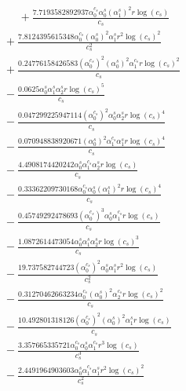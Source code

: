 \documentclass[10pt]{article}
\begin{document}
\begin{align*}
\phantom{R_{1,7}} &\phantom{={}}{}  + \frac{7.7193582892937 \alpha_{0}^{c_s} \alpha_{0}^s \left(\alpha_{1}^s\right)^{2} r \log{\left(c_{s} \right)}}{c_{s}} \\
&{}  + \frac{7.8124395615348 \alpha_{0}^{c_s} \left(\alpha_{0}^s\right)^{2} \alpha_{1}^s r^{2} \log{\left(c_{s} \right)}^{2}}{c_{s}^{2}} \\
&{}  + \frac{0.24776158426583 \left(\alpha_{0}^{c_s}\right)^{2} \left(\alpha_{0}^s\right)^{2} \alpha_{1}^{c_s} r \log{\left(c_{s} \right)}^{2}}{c_{s}} \\
&{}  - \frac{0.0625 \alpha_{0}^s \alpha_{1}^s \alpha_{2}^s r \log{\left(c_{s} \right)}^{5}}{c_{s}} \\
&{}  - \frac{0.047299225947114 \left(\alpha_{0}^{c_s}\right)^{2} \alpha_{0}^s \alpha_{2}^s r \log{\left(c_{s} \right)}^{4}}{c_{s}} \\
&{}  - \frac{0.070948838920671 \left(\alpha_{0}^s\right)^{2} \alpha_{1}^{c_s} \alpha_{1}^s r \log{\left(c_{s} \right)}^{4}}{c_{s}} \\
&{}  - \frac{4.4908174420242 \alpha_{0}^s \alpha_{1}^{c_s} \alpha_{2}^s r \log{\left(c_{s} \right)}}{c_{s}} \\
&{}  - \frac{0.33362209730168 \alpha_{0}^{c_s} \alpha_{0}^s \left(\alpha_{1}^s\right)^{2} r \log{\left(c_{s} \right)}^{4}}{c_{s}} \\
&{}  - \frac{0.45749292478693 \left(\alpha_{0}^{c_s}\right)^{3} \alpha_{0}^s \alpha_{1}^{c_s} r \log{\left(c_{s} \right)}}{c_{s}} \\
&{}  - \frac{1.0872614473054 \alpha_{0}^s \alpha_{1}^s \alpha_{2}^s r \log{\left(c_{s} \right)}^{3}}{c_{s}} \\
&{}  - \frac{19.737582744723 \left(\alpha_{0}^{c_s}\right)^{2} \alpha_{0}^s \alpha_{1}^s r^{2} \log{\left(c_{s} \right)}}{c_{s}^{2}} \\
&{}  - \frac{0.31270462663234 \alpha_{0}^{c_s} \left(\alpha_{0}^s\right)^{2} \alpha_{2}^{c_s} r \log{\left(c_{s} \right)}^{2}}{c_{s}} \\
&{}  - \frac{10.492801318126 \left(\alpha_{0}^{c_s}\right)^{2} \left(\alpha_{0}^s\right)^{2} \alpha_{1}^s r \log{\left(c_{s} \right)}}{c_{s}} \\
&{}  - \frac{3.357665335721 \alpha_{0}^{c_s} \alpha_{0}^s \alpha_{1}^{c_s} r^{3} \log{\left(c_{s} \right)}}{c_{s}^{3}} \\
&{}  - \frac{2.4491964903603 \alpha_{0}^s \alpha_{1}^{c_s} \alpha_{1}^s r^{2} \log{\left(c_{s} \right)}^{2}}{c_{s}^{2}} \\

\end{align*}
\end{document}
